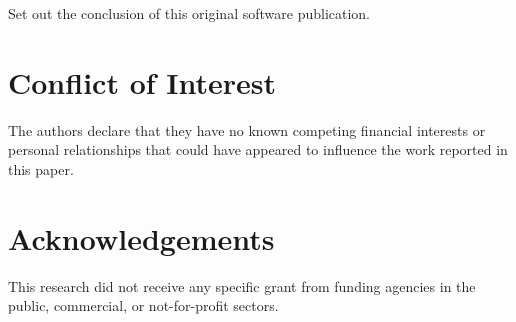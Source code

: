 \documentclass[preprint,12pt,letterpaper]{elsarticle}
\begin{document}
Set out the conclusion of this original software publication.


\section{Conflict of Interest}


The authors declare that they have no known competing financial interests or personal relationships that could have appeared to influence the work reported in this paper.


\section*{Acknowledgements}

This research did not receive any specific grant from funding agencies in the public, commercial, or not-for-profit sectors.







%
%
%
\end{document}
